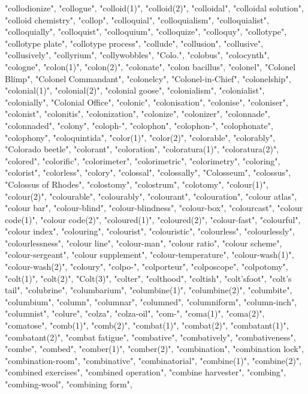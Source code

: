 "collodionize",
"collogue",
"colloid(1)",
"colloid(2)",
"colloidal",
"colloidal solution",
"colloid chemistry",
"collop",
"colloquial",
"colloquialism",
"colloquialist",
"colloquially",
"colloquist",
"colloquium",
"colloquize",
"colloquy",
"collotype",
"collotype plate",
"collotype process",
"collude",
"collusion",
"collusive",
"collusively",
"collyrium",
"collywobbles",
"Colo.",
"colobus",
"colocynth",
"cologne",
"colon(1)",
"colon(2)",
"colonate",
"colon bacillus",
"colonel",
"Colonel Blimp",
"Colonel Commandant",
"colonelcy",
"Colonel-in-Chief",
"colonelship",
"colonial(1)",
"colonial(2)",
"colonial goose",
"colonialism",
"colonialist",
"colonially",
"Colonial Office",
"colonic",
"colonisation",
"colonise",
"coloniser",
"colonist",
"colonitis",
"colonization",
"colonize",
"colonizer",
"colonnade",
"colonnaded",
"colony",
"coloph-",
"colophon",
"colophon-",
"colophonate",
"colophony",
"coloquintida",
"color(1)",
"color(2)",
"colorable",
"colorably",
"Colorado beetle",
"colorant",
"coloration",
"coloratura(1)",
"coloratura(2)",
"colored",
"colorific",
"colorimeter",
"colorimetric",
"colorimetry",
"coloring",
"colorist",
"colorless",
"colory",
"colossal",
"colossally",
"Colosseum",
"colossus",
"Colossus of Rhodes",
"colostomy",
"colostrum",
"colotomy",
"colour(1)",
"colour(2)",
"colourable",
"colourably",
"colourant",
"colouration",
"colour atlas",
"colour bar",
"colour-blind",
"colour-blindness",
"colour-box",
"colourcast",
"colour code(1)",
"colour code(2)",
"coloured(1)",
"coloured(2)",
"colour-fast",
"colourful",
"colour index",
"colouring",
"colourist",
"colouristic",
"colourless",
"colourlessly",
"colourlessness",
"colour line",
"colour-man",
"colour ratio",
"colour scheme",
"colour-sergeant",
"colour supplement",
"colour-temperature",
"colour-wash(1)",
"colour-wash(2)",
"coloury",
"colpo-",
"colporteur",
"colposcope",
"colpotomy",
"colt(1)",
"colt(2)",
"Colt(3)",
"colter",
"colthood",
"coltish",
"colt'sfoot",
"colt's tail",
"colubrine",
"columbarium",
"columbine(1)",
"columbine(2)",
"columbite",
"columbium",
"column",
"columnar",
"columned",
"columniform",
"column-inch",
"columnist",
"colure",
"colza",
"colza-oil",
"com-",
"coma(1)",
"coma(2)",
"comatose",
"comb(1)",
"comb(2)",
"combat(1)",
"combat(2)",
"combatant(1)",
"combatant(2)",
"combat fatigue",
"combative",
"combatively",
"combativeness",
"combe",
"combed",
"comber(1)",
"comber(2)",
"combination",
"combination lock",
"combination-room",
"combinative",
"combinatorial",
"combine(1)",
"combine(2)",
"combined exercises",
"combined operation",
"combine harvester",
"combing",
"combing-wool",
"combining form",
